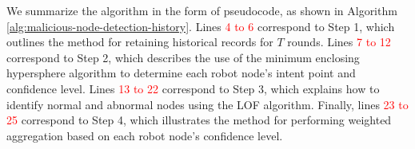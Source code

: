 \documentclass[lettersize,journal]{IEEEtran}
\begin{document}

We summarize the algorithm in the form of pseudocode, as shown in Algorithm \ref{alg:malicious-node-detection-history}. Lines \textcolor{red}{4 to 6} correspond to Step 1, which outlines the method for retaining historical records for \(T\) rounds. Lines \textcolor{red}{7 to 12} correspond to Step 2, which describes the use of the minimum enclosing hypersphere algorithm to determine each robot node's intent point and confidence level. Lines \textcolor{red}{13 to 22} correspond to Step 3, which explains how to identify normal and abnormal nodes using the LOF algorithm. Finally, lines \textcolor{red}{23 to 25} correspond to Step 4, which illustrates the method for performing weighted aggregation based on each robot node's confidence level.
\end{document}

